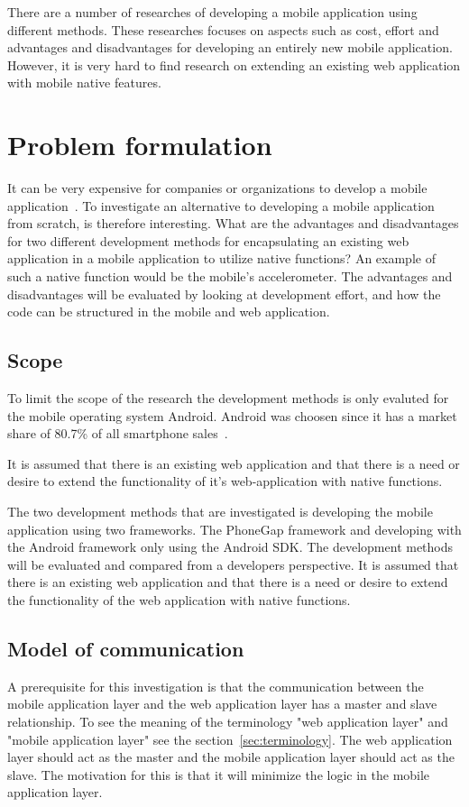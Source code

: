 There are a number of researches of developing a mobile application using different methods. These researches focuses on aspects such as cost, effort and advantages and disadvantages for developing an entirely new mobile application. However, it is very hard to find research on extending an existing web application with mobile native features.

\section{Problem formulation}\label{sec:problem-formulation}
It can be very expensive for companies or organizations to develop a mobile application~\cite{kohan2015}. To investigate an alternative to developing a mobile application from scratch, is therefore interesting. What are the advantages and disadvantages for two different development methods for encapsulating an existing web application in a mobile application to utilize native functions? An example of such a native function would be the mobile's accelerometer. The advantages and disadvantages will be evaluated by looking at development effort, and how the code can be structured in the mobile and web application.

\subsection{Scope} \label{subsec:scope}
To limit the scope of the research the development methods is only evaluted for the mobile operating system Android. Android was choosen since it has a market share of 80.7\% of all smartphone sales~\cite{gartner2015}.

It is assumed that there is an existing web application and that there is a need or desire to extend the functionality of it's web-application with native functions.

The two development methods that are investigated is developing the mobile application using two frameworks. The PhoneGap framework and developing with the Android framework only using the Android SDK. The development methods will be evaluated and compared from a developers perspective. It is assumed that there is an existing web application and that there is a need or desire to extend the functionality of the web application with native functions.

\subsection{Model of communication} \label{subsec:model-of-communication}
A prerequisite for this investigation is that the communication between the mobile application layer and the web application layer has a master and slave relationship. To see the meaning of the terminology "web application layer" and "mobile application layer" see the section~\ref{sec:terminology}. The web application layer should act as the master and the mobile application layer should act as the slave. The motivation for this is that it will minimize the logic in the mobile application layer.


